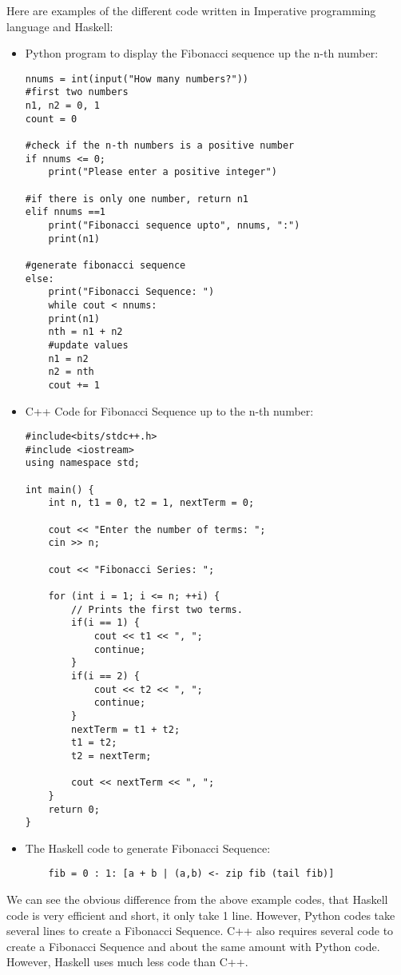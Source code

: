 \documentclass{article}
\begin{document}
\medskip\noindent
Here are examples of the different code written in Imperative programming language and Haskell:
\begin{itemize}
\item Python program to display the Fibonacci sequence up the n-th number:
\begin{lstlisting}
nnums = int(input("How many numbers?"))
#first two numbers
n1, n2 = 0, 1
count = 0

#check if the n-th numbers is a positive number 
if nnums <= 0;
	print("Please enter a positive integer")
	
#if there is only one number, return n1
elif nnums ==1
	print("Fibonacci sequence upto", nnums, ":")
	print(n1)
	
#generate fibonacci sequence
else:
	print("Fibonacci Sequence: ")
	while cout < nnums:
	print(n1)
	nth = n1 + n2
	#update values 
	n1 = n2
	n2 = nth 
	cout += 1
\end{lstlisting}
\item C++ Code for Fibonacci Sequence up to the n-th number:
\begin{lstlisting}
#include<bits/stdc++.h>
#include <iostream>
using namespace std;

int main() {
    int n, t1 = 0, t2 = 1, nextTerm = 0;

    cout << "Enter the number of terms: ";
    cin >> n;

    cout << "Fibonacci Series: ";

    for (int i = 1; i <= n; ++i) {
        // Prints the first two terms.
        if(i == 1) {
            cout << t1 << ", ";
            continue;
        }
        if(i == 2) {
            cout << t2 << ", ";
            continue;
        }
        nextTerm = t1 + t2;
        t1 = t2;
        t2 = nextTerm;
        
        cout << nextTerm << ", ";
    }
    return 0;
}\end{lstlisting}
\item The Haskell code to generate Fibonacci Sequence:
\begin{lstlisting}
	fib = 0 : 1: [a + b | (a,b) <- zip fib (tail fib)]
\end{lstlisting}
\end{itemize}
We can see the obvious difference from the above example codes, that Haskell code is very efficient and short, it only take 1 line. However, Python codes take several lines to create a Fibonacci Sequence.
C++ also requires several code to create a Fibonacci Sequence and about the same amount with Python code. However, Haskell uses much less code than C++.
\end{document}
